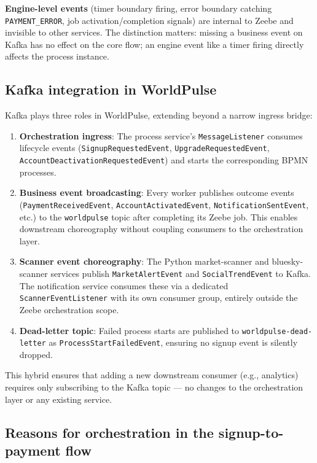 \documentclass[10pt,a4paper]{article}
\begin{document}
\textbf{Engine-level events} (timer boundary firing, error boundary catching \texttt{PAYMENT\_ERROR}, job activation/completion signals) are internal to Zeebe and invisible to other services. The distinction matters: missing a business event on Kafka has no effect on the core flow; an engine event like a timer firing directly affects the process instance.

\subsection{Kafka integration in WorldPulse}

Kafka plays three roles in WorldPulse, extending beyond a narrow ingress bridge:

\begin{enumerate}
    \item \textbf{Orchestration ingress}: The process service's \texttt{MessageListener} consumes lifecycle events (\texttt{SignupRequestedEvent}, \texttt{UpgradeRequestedEvent}, \texttt{AccountDeactivationRequestedEvent}) and starts the corresponding BPMN processes.
    \item \textbf{Business event broadcasting}: Every worker publishes outcome events (\texttt{PaymentReceivedEvent}, \texttt{AccountActivatedEvent}, \texttt{NotificationSentEvent}, etc.) to the \texttt{worldpulse} topic after completing its Zeebe job. This enables downstream choreography without coupling consumers to the orchestration layer.
    \item \textbf{Scanner event choreography}: The Python market-scanner and bluesky-scanner services publish \texttt{MarketAlertEvent} and \texttt{SocialTrendEvent} to Kafka. The notification service consumes these via a dedicated \texttt{ScannerEventListener} with its own consumer group, entirely outside the Zeebe orchestration scope.
    \item \textbf{Dead-letter topic}: Failed process starts are published to \texttt{worldpulse-dead-letter} as \texttt{ProcessStartFailedEvent}, ensuring no signup event is silently dropped.
\end{enumerate}

This hybrid ensures that adding a new downstream consumer (e.g., analytics) requires only subscribing to the Kafka topic --- no changes to the orchestration layer or any existing service.

\subsection{Reasons for orchestration in the signup-to-payment flow}
\end{document}
